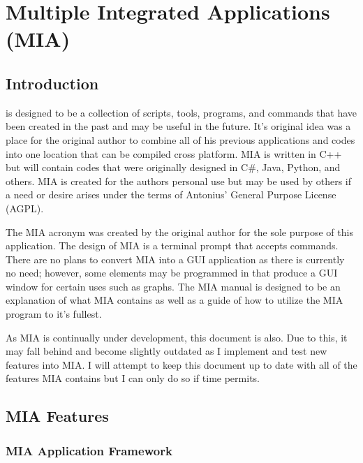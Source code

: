 \chapter{Multiple Integrated Applications (MIA)}
\pagestyle{fancy}

\section{Introduction}

 is designed to be a collection of scripts, tools, programs, and commands that have been created in the past and may be useful in the future. It's original idea was a place for the original author to combine all of his previous applications and codes into one location that can be compiled cross platform. MIA is written in C++ but will contain codes that were originally designed in C\#, Java, Python, and others. MIA is created for the authors personal use but may be used by others if a need or desire arises under the terms of Antonius’ General Purpose License (AGPL). 

The MIA acronym was created by the original author for the sole purpose of this application. The design of MIA is a terminal prompt that accepts commands. There are no plans to convert MIA into a GUI application as there is currently no need; however, some elements may be programmed in that produce a GUI window for certain uses such as graphs. The MIA manual is designed to be an explanation of what MIA contains as well as a guide of how to utilize the MIA program to it's fullest. 

As MIA is continually under development, this document is also. Due to this, it may fall behind and become slightly outdated as I implement and test new features into MIA. I will attempt to keep this document up to date with all of the features MIA contains but I can only do so if time permits.


















\section{MIA Features}

\subsection{MIA Application Framework}

